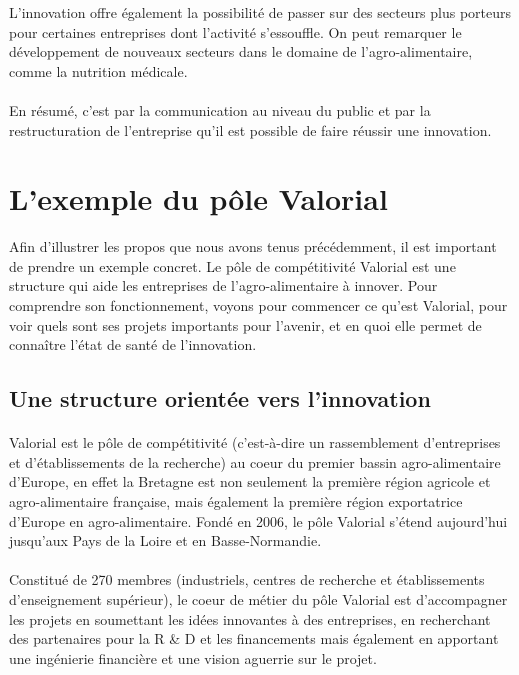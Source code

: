 \documentclass[a4paper,12pt]{report}
\begin{document}
	L’innovation offre également la possibilité de passer sur des secteurs plus porteurs pour certaines entreprises dont l’activité s'essouffle. On peut remarquer le développement de nouveaux secteurs dans le domaine de l’agro-alimentaire, comme la nutrition médicale.
	
	\paragraph{}En résumé, c'est par la communication au niveau du public et par la restructuration de l'entreprise qu'il est possible de faire réussir une innovation.
			
	\section{L'exemple du pôle Valorial}
	
		Afin d'illustrer les propos que nous avons tenus précédemment, il est important de prendre un exemple concret. Le pôle de compétitivité Valorial est une structure qui aide les entreprises de l'agro-alimentaire à innover. Pour comprendre son fonctionnement, voyons pour commencer ce qu'est Valorial, pour voir quels sont ses projets importants pour l'avenir, et en quoi elle permet de connaître l'état de santé de l'innovation.
		
		\subsection{Une structure orientée vers l'innovation}
			\paragraph{}Valorial est le pôle de compétitivité (c’est-à-dire un rassemblement d’entreprises et d’établissements de la recherche) au coeur du premier bassin agro-alimentaire d’Europe\cite{SiteValorial}, en effet la Bretagne est non seulement la première région agricole et agro-alimentaire française, mais également la première région exportatrice d’Europe en agro-alimentaire\cite{RennesAtalante}. Fondé en 2006, le pôle Valorial s’étend aujourd’hui jusqu’aux Pays de la Loire et en Basse-Normandie.

			 \paragraph{}Constitué de 270 membres (industriels, centres de recherche et établissements d’enseignement supérieur), le coeur de métier du pôle Valorial est d’accompagner les projets en soumettant les idées innovantes à des entreprises, en recherchant des partenaires pour la R \& D et les financements mais également en apportant une ingénierie financière et une vision aguerrie sur le projet. 
			
\end{document}
